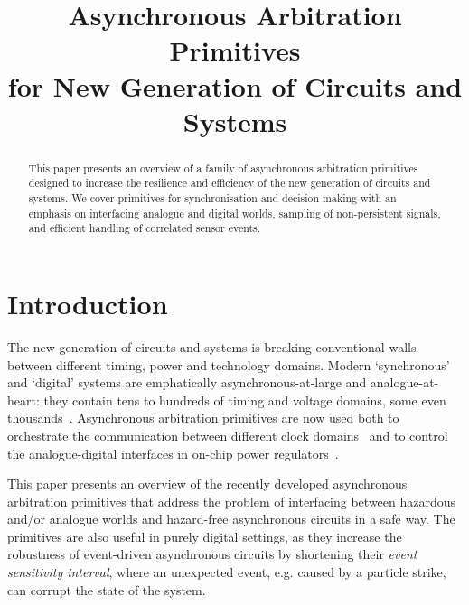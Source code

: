 \documentclass[conference]{IEEEtran}
\begin{document}
\title{Asynchronous Arbitration Primitives\\for New Generation of Circuits and Systems\vspace{-3mm}}
\author{
}

\maketitle

\begin{abstract}
This paper presents an overview of a family of asynchronous arbitration primitives designed
to increase the resilience and efficiency of the new generation of circuits and systems.
We cover primitives for synchronisation and decision-making with an emphasis on interfacing
analogue and digital worlds, sampling of non-persistent signals, and efficient handling of
correlated sensor events.
\end{abstract}


\section{Introduction}

The new generation of circuits and systems is breaking conventional walls between
different timing, power and technology domains. Modern `synchronous' and `digital'
systems are emphatically asynchronous-at-large and analogue-at-heart: they contain tens
to hundreds of timing and voltage domains, some even thousands~\cite{2017_bohnenstiehl_kilocore}.
Asynchronous arbitration primitives are now used both to orchestrate the communication
between different clock domains~\cite{2017_jiang_noc} and to control the analogue-digital
interfaces in on-chip power regulators~\cite{2017_sokolov_a4a}.


This paper presents an overview of the recently developed asynchronous arbitration
primitives that address the problem of interfacing between hazardous and/or analogue
worlds and hazard-free asynchronous circuits in a safe way. The primitives are
also useful in purely digital settings, as they increase the robustness of event-driven
asynchronous circuits by shortening their \emph{event sensitivity interval}, where an unexpected
event, e.g. caused by a particle strike, can corrupt the state of the system.
\end{document}
